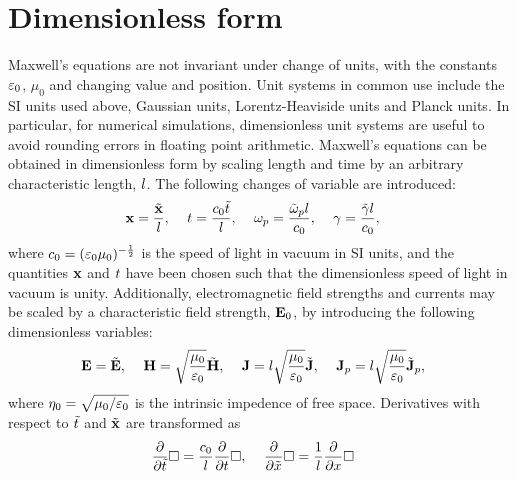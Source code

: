 \section{Dimensionless form}
Maxwell's equations are not invariant under change of units, with the constants
$\varepsilon_0$, $\mu_0$ and changing value and position. Unit systems in common use
include the SI units used above, Gaussian units, Lorentz-Heaviside units and
Planck units. In particular, for numerical simulations, dimensionless unit
systems are useful to avoid rounding errors in floating point arithmetic. Maxwell's equations can be obtained in dimensionless form by scaling length and
time by an arbitrary characteristic length, $l$. The following changes of
variable are introduced:
\begin{align}
  \label{eq:dimensionless-scaling-1}
  \mathbf{x} &= \frac{\tilde{\mathbf{x}}}{l}, &  \
                                        t &= \frac{c_0 \tilde{t}}{l}, &  \
                                                                                \omega_p &= \frac{\tilde{\omega}_p l}{c_0}, & \
                                                                                                                                       \gamma &= \frac{\tilde{\gamma} l}{c_0},
\end{align}
where $c_0 = ( \varepsilon_0 \mu_0 )^{-\frac{1}{2}}$ is the speed of light in vacuum
in SI units, and the quantities $\mathbf{x}$ and $t$ have been chosen such that the
dimensionless speed of light in vacuum is unity. Additionally, electromagnetic
field strengths and currents may be scaled by a characteristic field strength,
$\mathbf{E}_0$, by introducing the following dimensionless variables:
\begin{align}
  \label{eq:dimensionless-scaling-2}
  \mathbf{E} &= \tilde{\mathbf{E}}, &  \
                   \mathbf{H} &= \sqrt{\frac{\mu_0}{\varepsilon_0}} \tilde{\mathbf{H}}, &  \
                                              \mathbf{J} &= l \sqrt{\frac{\mu_0}{\varepsilon_0}} \tilde{\mathbf{J}}, & \
                                                                                  \mathbf{J}_p &= l \sqrt{\frac{\mu_0}{\varepsilon_0}} \tilde{\mathbf{J}}_p,
\end{align}
where $\eta_0 = \sqrt{\mu_0 / \varepsilon_0}$ is the intrinsic impedence of free space. Derivatives with respect to $\tilde{t}$ and $\tilde{\mathbf{x}}$ are transformed as
\begin{align} \label{eq:dimensionless-scaling-3} \frac{\partial}{\partial \tilde{t} } \Box &= \frac{c_0}{l}\frac{\partial}{\partial t} \Box, & \ \frac{\partial}{\partial \tilde{x}} \Box &= \frac{1}{l}\frac{\partial}{\partial x} \Box \end{align}
